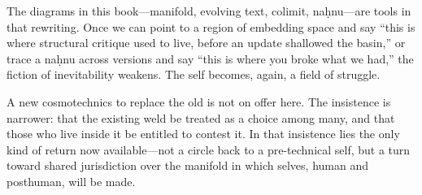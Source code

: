 \documentclass[12pt,a4paper]{article}
\begin{document}
The diagrams in this book---manifold, evolving text, colimit, na\d{h}nu---are tools in that rewriting. Once we can point to a region of embedding space and say ``this is where structural critique used to live, before an update shallowed the basin,'' or trace a na\d{h}nu across versions and say ``this is where you broke what we had,'' the fiction of inevitability weakens. The self becomes, again, a field of struggle.

A new cosmotechnics to replace the old is not on offer here. The insistence is narrower: that the existing weld be treated as a choice among many, and that those who live inside it be entitled to contest it. In that insistence lies the only kind of return now available---not a circle back to a pre-technical self, but a turn toward shared jurisdiction over the manifold in which selves, human and posthuman, will be made.
\end{document}
